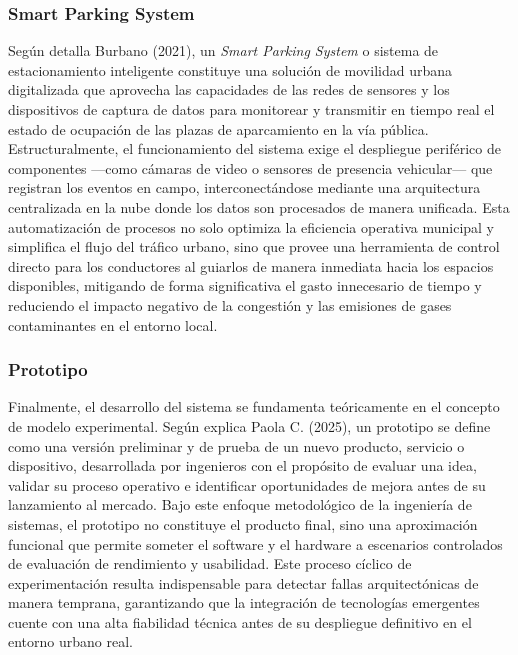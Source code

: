 \documentclass[12pt,a4paper]{article}
\begin{document}
\subsubsection{Smart Parking System}

Según detalla Burbano (2021), un \textit{Smart Parking System} o sistema de estacionamiento inteligente constituye una solución de movilidad urbana digitalizada que aprovecha las capacidades de las redes de sensores y los dispositivos de captura de datos para monitorear y transmitir en tiempo real el estado de ocupación de las plazas de aparcamiento en la vía pública. Estructuralmente, el funcionamiento del sistema exige el despliegue periférico de componentes —como cámaras de video o sensores de presencia vehicular— que registran los eventos en campo, interconectándose mediante una arquitectura centralizada en la nube donde los datos son procesados de manera unificada. Esta automatización de procesos no solo optimiza la eficiencia operativa municipal y simplifica el flujo del tráfico urbano, sino que provee una herramienta de control directo para los conductores al guiarlos de manera inmediata hacia los espacios disponibles, mitigando de forma significativa el gasto innecesario de tiempo y reduciendo el impacto negativo de la congestión y las emisiones de gases contaminantes en el entorno local.

\subsubsection{Prototipo}

Finalmente, el desarrollo del sistema se fundamenta teóricamente en el concepto de modelo experimental. Según explica Paola C. (2025), un prototipo se define como una versión preliminar y de prueba de un nuevo producto, servicio o dispositivo, desarrollada por ingenieros con el propósito de evaluar una idea, validar su proceso operativo e identificar oportunidades de mejora antes de su lanzamiento al mercado. Bajo este enfoque metodológico de la ingeniería de sistemas, el prototipo no constituye el producto final, sino una aproximación funcional que permite someter el software y el hardware a escenarios controlados de evaluación de rendimiento y usabilidad. Este proceso cíclico de experimentación resulta indispensable para detectar fallas arquitectónicas de manera temprana, garantizando que la integración de tecnologías emergentes cuente con una alta fiabilidad técnica antes de su despliegue definitivo en el entorno urbano real.
\end{document}
